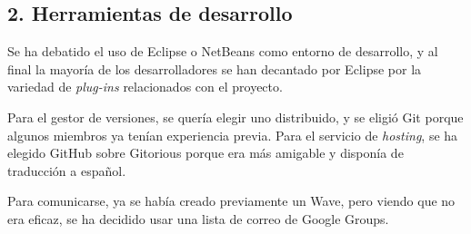 \documentclass[a4paper,11pt,oneside]{article}
\begin{document}
\subsection*{2. Herramientas de desarrollo}

Se ha debatido el uso de Eclipse o NetBeans como entorno de desarrollo, y al
final la mayoría de los desarrolladores se han decantado por Eclipse por la
variedad de \textit{plug-ins} relacionados con el proyecto.

Para el gestor de versiones, se quería elegir uno distribuido, y se eligió Git
porque algunos miembros ya tenían experiencia previa. Para el servicio de
\textit{hosting}, se ha elegido GitHub sobre Gitorious porque era más amigable
y disponía de traducción a español.

Para comunicarse, ya se había creado previamente un Wave, pero viendo que no
era eficaz, se ha decidido usar una lista de correo de Google Groups.
\end{document}
